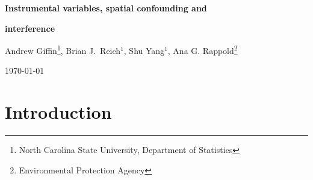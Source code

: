 \documentclass[12pt]{article}
\begin{document}
\vspace*{.6in}
\begin{center}
{\Large \textbf{Instrumental variables, spatial confounding and}}

\vspace{8pt}
{\Large \textbf{interference}}
\\ \vspace{6pt}

\vspace*{.3in}
{\large Andrew Giffin\footnote[1]{North Carolina State University, Department of Statistics}, Brian J.~Reich$^1$, Shu Yang$^1$, Ana G. Rappold\footnote[2]{Environmental Protection Agency}}\\
\vspace*{.1in}

\today
\end{center}

\vspace{.1in}

\begin{abstract}\begin{singlespace}
\noindent Unobserved spatial confounding variables are prevalent in environmental and ecological applications where the system under study is complex and the data are often observational. Instrumental variables (IVs) are a common way to address unobserved confounding; however, the efficacy of using IVs on spatial confounding is largely unknown. This paper explores the effectiveness of IVs in this situation -- with particular attention paid to the spatial scale of the instrument. We show that, in case of spatially-dependent treatments,  IVs are most effective when they vary at a finer spatial resolution than the treatment. We investigate IV performance in extensive simulations and apply the model in the example of long term trends in the air pollution and  cardiovascular mortality in the United States over 1990-2010. Finally, the IV approach is also extended to the spatial interference setting, in which treatments can affect nearby responses. \vspace{12pt}\\
{\bf Key words:} Spatial confounding, instrumental variable, air pollution, cardiovascular mortality, interference. \end{singlespace}\end{abstract}

\vspace{.1in}

\section{Introduction}
\end{document}
